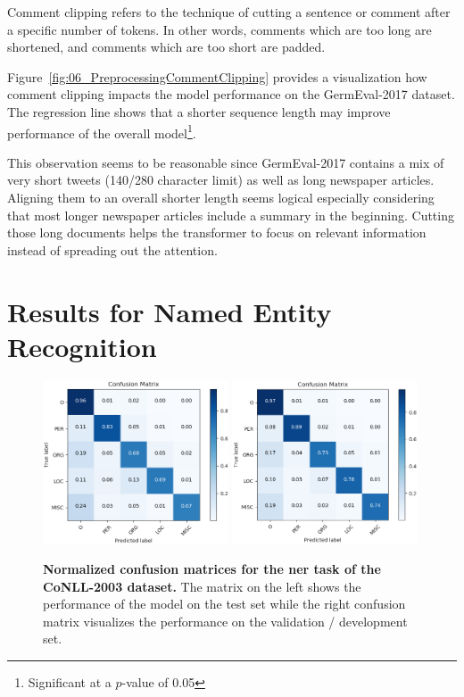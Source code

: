 Comment clipping refers to the technique of cutting a sentence or comment after a specific number of tokens. In other words, comments which are too long are shortened, and comments which are too short are padded.

Figure~\ref{fig:06_PreprocessingCommentClipping} provides a visualization how comment clipping impacts the model performance on the GermEval-2017 dataset. The regression line shows that a shorter sequence length may improve performance of the overall model\footnote{Significant at a $p$-value of 0.05}.
\medskip

This observation seems to be reasonable since GermEval-2017 contains a mix of very short tweets {(140/280 character limit)} as well as long newspaper articles. Aligning them to an overall shorter length seems logical especially considering that most longer newspaper articles include a summary in the beginning. Cutting those long documents helps the transformer to focus on relevant information instead of spreading out the attention.

\section{Results for Named Entity Recognition}

\begin{figure}[ht]
    \centering
    \includegraphics[width=0.49\textwidth]{figures/06_results/06_ner_final_test_c_matrix}
    \includegraphics[width=0.49\textwidth]{figures/06_results/06_ner_final_valid_c_matrix}
    \caption{\textbf{Normalized confusion matrices for the \gls{ner} task of the CoNLL-2003 dataset.} The matrix on the left shows the performance of the model on the test set while the right confusion matrix visualizes the performance on the validation / development set.}
    \label{fig:06_NER_cmatrices}
\end{figure}

